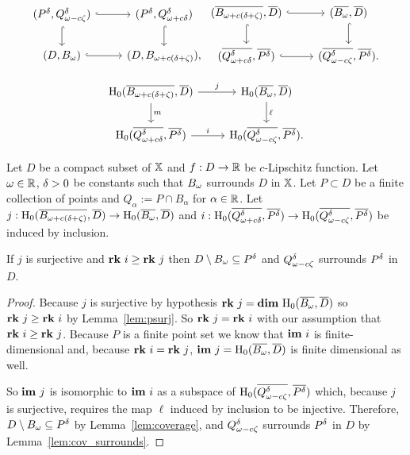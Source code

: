 \[ \begin{tikzcd}
  (P^\of, \Q^\of) \arrow[hookrightarrow]{r}\arrow[hookrightarrow]{d} &
  (P^\of, \QQ^\of) \arrow[hookrightarrow]{d} \\
  (D, \bb) \arrow[hookrightarrow]{r} &
  (D, B_{\omega+c(\delta+\zeta)}),
\end{tikzcd}\begin{tikzcd}
  (\cmp{B_{\omega+c(\delta+\zeta)}},\cmp{D})\arrow[hookrightarrow]{d}\arrow[hookrightarrow]{r} &
  (\cmp{\bb}, \cmp{D}) \arrow[hookrightarrow]{d}\\
  (\cmp{\QQ^\of}, \cmp{P^\of}) \arrow[hookrightarrow]{r} &
  (\cmp{\Q^\of}, \cmp{P^\of}).
\end{tikzcd}\]

\begin{equation}\label{dgm:1}\begin{tikzcd}
  \hom_0(\cmp{B_{\omega+c(\delta+\zeta)}},\cmp{D})\arrow{d}{m} \arrow{r}{j} &
  \hom_0(\cmp{\bb}, \cmp{D}) \arrow{d}{\ell} \\
  \hom_0(\cmp{\QQ^\of}, \cmp{P^\of}) \arrow{r}{i} &
  \hom_0(\cmp{\Q^\of}, \cmp{P^\of}).
\end{tikzcd}\end{equation}

\begin{theorem}\label{thm:geo_tcc}
  Let $D$ be a compact subset of $\mathbb{X}$ and $f : D\to\mathbb{R}$ be $c$-Lipschitz function.
  Let $\omega\in\mathbb{R}$, ${\delta} > 0$ be constants such that $B_{\omega}$ surrounds $D$ in $\mathbb{X}$.
  Let $P\subset D$ be a finite collection of points and $Q_\alpha := P\cap B_\alpha$ for $\alpha\in\mathbb{R}$.
  Let $j : \mathrm{H}_0(\overline{B_{\omega+c(\delta+\zeta)}},\overline{D})\to \mathrm{H}_0(\overline{B_{\omega}},\overline{D})$ and $i : \mathrm{H}_0(\overline{Q_{\omega + c{\delta}}^{\delta}}, \overline{P^{\delta}})\to \mathrm{H}_0(\overline{Q_{\omega - c\zeta}^{\delta}}, \overline{P^{\delta}})$ be induced by inclusion.

  If $j$ is surjective and $\mathbf{rk}~i\geq \mathbf{rk}~j$ then $D\setminus B_{\omega}\subseteq P^{\delta}$ and $Q_{\omega - c\zeta}^{\delta}$ surrounds $P^{\delta}$ in $D$.
\end{theorem}
\begin{proof}
  Because $j$ is surjective by hypothesis $\mathbf{rk}~j = \mathbf{dim}~\mathrm{H}_0(\overline{B_{\omega}},\overline{D})$ so $\mathbf{rk}~j\geq \mathbf{rk}~i$ by Lemma~\ref{lem:psurj}.
  So $\mathbf{rk}~j = \mathbf{rk}~i$ with our assumption that $\mathbf{rk}~i\geq \mathbf{rk}~j$.
  Because $P$ is a finite point set we know that $\mathbf{im}~i$ is finite-dimensional and, because $\mathbf{rk}~i = \mathbf{rk}~j$, $\mathbf{im}~j=\mathrm{H}_0(\overline{B_{\omega}}, \overline{D})$ is finite dimensional as well.

  So $\mathbf{im}~j$ is isomorphic to $\mathbf{im}~i$ as a subspace of $\mathrm{H}_0(\overline{Q_{\omega - c\zeta}^{\delta}}, \overline{P^{\delta}})$ which, because $j$ is surjective, requires the map $\ell$ induced by inclusion to be injective.
  Therefore, $D\setminus B_\omega\subseteq P^{\delta}$ by Lemma~\ref{lem:coverage}, and $Q_{\omega - c\zeta}^{\delta}$ surrounds $P^{\delta}$ in $D$ by Lemma~\ref{lem:cov_surrounds}.
\end{proof}

